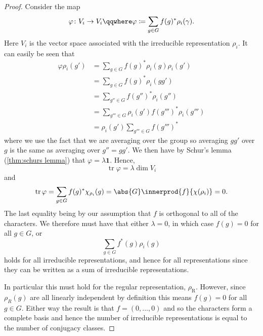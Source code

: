 \documentclass[fleqn]{NotesClass}
\newcommand*{\ident}{\mathbf{1}}
\DeclareMathOperator{\tr}{tr}
\begin{document}
\begin{thm}{}{}
\begin{proof}
            Consider the map
            \begin{equation}
                \varphi \colon V_i \to V_i \qqwhere \varphi \coloneqq \sum_{g \in G} f(g)^* \rho_i(\gamma).
            \end{equation}
            Here \(V_i\) is the vector space associated with the irreducible representation \(\rho_i\).
            It can easily be seen that
            \begin{align}
                \varphi \rho_i(g') &= \sum_{g\in G} f(g)^* \rho_i(g)\rho_i(g')\\
                &= \sum_{g\in G} f(g)^* \rho_i(gg')\\
                &= \sum_{g''\in G} f(g'')^* \rho_i(g'')\\
                &= \sum_{g'''\in G} \rho_i(g')f(g''')^*\rho_i(g''')\\
                &= \rho_i(g') \sum_{g'''\in G} f(g''')^*
            \end{align}
            where we use the fact that we are averaging over the group so averaging \(gg'\) over \(g\) is the same as averaging over \(g'' = gg'\).
            We then have by Schur's lemma (\cref{thm:schurs lemma}) that \(\varphi = \lambda\ident\).
            Hence,
            \begin{equation}
                \tr\varphi = \lambda\dim V_i
            \end{equation}
            and
            \begin{equation}
                \tr\varphi = \sum_{g \in G} f(g)^* \chi_{\rho_i}(g) = \abs{G} \innerprod{f}{\chi(\rho_i)} = 0.
            \end{equation}
            The last equality being by our assumption that \(f\) is orthogonal to all of the characters.
            We therefore must have that either \(\lambda = 0\), in which case \(f(g) = 0\) for all \(g \in G\), or
            \begin{equation}
                \sum_{g\in G} f^*(g)\rho_i(g)
            \end{equation}
            holds for all irreducible representations, and hence for all representations since they can be written as a sum of irreducible representations.
            
            In particular this must hold for the regular representation, \(\rho_{\mathrm{R}}\).
            However, since \(\rho_{R}(g)\) are all linearly independent by definition this means \(f(g) = 0\) for all \(g \in G\).
            Either way the result is that \(f = (0, \dotsc, 0)\) and so the characters form a complete basis and hence the number of irreducible representations is equal to the number of conjugacy classes.
        \end{proof}
    \end{thm}
    
\end{document}

